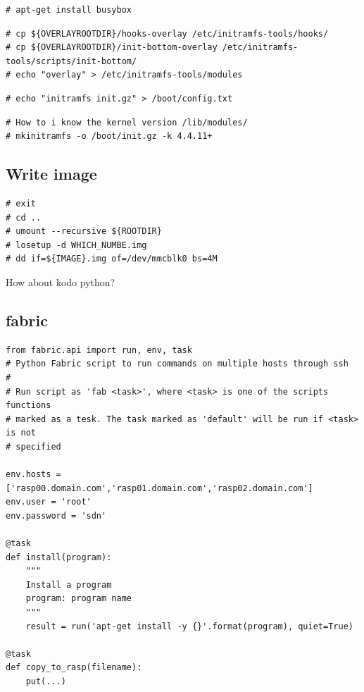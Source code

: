 \begin{lstlisting}[]
# apt-get install busybox
\end{lstlisting}
\FloatBarrier

\begin{lstlisting}[]
# cp ${OVERLAYROOTDIR}/hooks-overlay /etc/initramfs-tools/hooks/
# cp ${OVERLAYROOTDIR}/init-bottom-overlay /etc/initramfs-tools/scripts/init-bottom/
# echo "overlay" > /etc/initramfs-tools/modules
\end{lstlisting}
\FloatBarrier

\begin{lstlisting}[]
# echo "initramfs init.gz" > /boot/config.txt
\end{lstlisting}
\FloatBarrier

\begin{lstlisting}[]
# How to i know the kernel version /lib/modules/
# mkinitramfs -o /boot/init.gz -k 4.4.11+
\end{lstlisting}
\FloatBarrier

\subsection{Write image}

\begin{lstlisting}[]
# exit
# cd ..
# umount --recursive ${ROOTDIR}
# losetup -d WHICH_NUMBE.img
# dd if=${IMAGE}.img of=/dev/mmcblk0 bs=4M
\end{lstlisting}
\FloatBarrier

How about kodo python?

\subsection{fabric}

\begin{lstlisting}[]
from fabric.api import run, env, task
# Python Fabric script to run commands on multiple hosts through ssh
#
# Run script as 'fab <task>', where <task> is one of the scripts functions
# marked as a tesk. The task marked as 'default' will be run if <task> is not
# specified

env.hosts = ['rasp00.domain.com','rasp01.domain.com','rasp02.domain.com']
env.user = 'root'
env.password = 'sdn'

@task
def install(program):
    """
    Install a program
    program: program name
    """
    result = run('apt-get install -y {}'.format(program), quiet=True)

@task
def copy_to_rasp(filename):
    put(...)

\end{lstlisting}
\FloatBarrier


